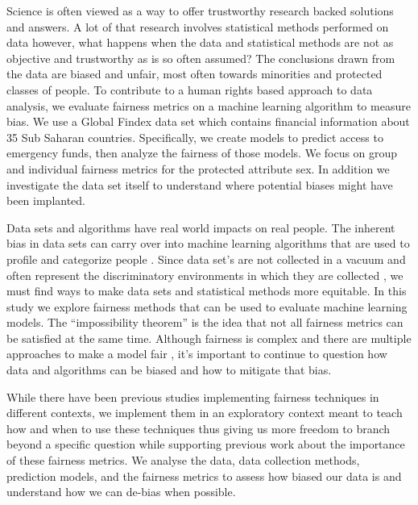 \documentclass[water,article,submit,moreauthors,pdftex]{mdpi}
\begin{document}
Science is often viewed as a way to offer trustworthy research backed
solutions and answers. A lot of that research involves statistical
methods performed on data however, what happens when the data and
statistical methods are not as objective and trustworthy as is so often
assumed? The conclusions drawn from the data are biased and unfair, most
often towards minorities and protected classes of people. To contribute
to a human rights based approach to data analysis, we evaluate fairness
metrics on a machine learning algorithm to measure bias. We use a Global
Findex data set which contains financial information about 35 Sub
Saharan countries. Specifically, we create models to predict access to
emergency funds, then analyze the fairness of those models. We focus on
group and individual fairness metrics for the protected attribute sex.
In addition we investigate the data set itself to understand where
potential biases might have been implanted.

Data sets and algorithms have real world impacts on real people. The
inherent bias in data sets can carry over into machine learning
algorithms that are used to profile and categorize people
\citep{navarro2021risk, hellstrom2020bias}. Since data set's are not
collected in a vacuum and often represent the discriminatory
environments in which they are collected
\citep{barocas_fairness_nodate}, we must find ways to make data sets and
statistical methods more equitable. In this study we explore fairness
methods that can be used to evaluate machine learning models. The
``impossibility theorem'' is the idea that not all fairness metrics can
be satisfied at the same time\citep{kleinberg2016inherent}. Although
fairness is complex and there are multiple approaches to make a model
fair \citep{kypraiou_what_2021, green2018myth}, it's important to
continue to question how data and algorithms can be biased and how to
mitigate that bias.

While there have been previous studies implementing fairness techniques
in different contexts\citep{deho2022existing, kim2022information}, we
implement them in an exploratory context meant to teach how and when to
use these techniques thus giving us more freedom to branch beyond a
specific question while supporting previous work about the importance of
these fairness metrics\citep{anahideh2022fair, barocas_fairness_nodate}.
We analyse the data, data collection methods, prediction models, and the
fairness metrics to assess how biased our data is and understand how we
can de-bias when possible.
\end{document}
